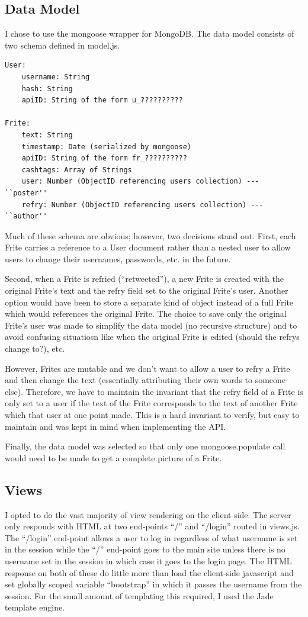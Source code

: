\documentclass{amsart}
\begin{document}
\subsection{Data Model}
I chose to use the mongoose wrapper for MongoDB. The data model consists of two schema
defined in model.js.
\begin{verbatim}
User:
    username: String
    hash: String
    apiID: String of the form u_??????????

Frite:
    text: String
    timestamp: Date (serialized by mongoose)
    apiID: String of the form fr_??????????
    cashtags: Array of Strings
    user: Number (ObjectID referencing users collection) --- ``poster''
    refry: Number (ObjectID referencing users collection) --- ``author''
\end{verbatim}
Much of these schema are obvious; however, two decisions stand out. First, each Frite
carries a reference to a User document rather than a nested user to allow users to
change their usernames, passwords, etc. in the future.

Second, when a Frite is refried (``retweeted''), a new Frite is created with the
original Frite's text and the refry field set to the original Frite's user. Another option
would have been to store a separate kind of object instead of a full Frite which would
references the original Frite. The choice to save only the original Frite's user
was made to simplify the data model (no recursive structure) and to avoid confusing
situatiosn like when the original Frite is edited (should the refrys change to?), etc.

However, Frites are mutable and we don't want to allow a user to refry a Frite and then
change the text (essentially attributing their own words to someone else). Therefore,
we have to maintain the invariant that the
refry field of a Frite is only set to a user if the text of the Frite corresponds to the text
of another Frite which that user at one point made. This is a hard invariant to verify, but
easy to maintain and was kept in mind when implementing the API.

Finally, the data model was selected so that only one mongoose.populate call would
need to be made to get a complete picture of a Frite.

\subsection{Views}
I opted to do the vast majority of view rendering on the client side. The server only
responds with HTML at two end-points ``/'' and ``/login'' routed in views.js.
The ``/login'' end-point
allows a user to log in regardless of what username is set in the session while the
``/'' end-point goes to the main site unless there is no username set in the session
in which case it goes to the login page. The HTML response on both of these do little
more than load the client-side javascript and set globally scoped variable ``bootstrap''
in which it passes the username from the session. For the small amount of templating
this required, I used the Jade template engine.
\end{document}

